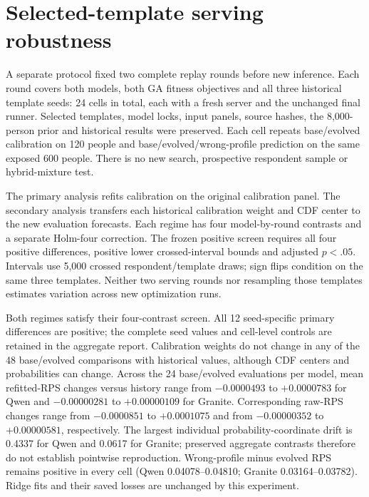 \documentclass[sigconf,anonymous]{aamas}
\begin{document}
\section{Selected-template serving robustness}
A separate protocol fixed two complete replay rounds before new inference.
Each round covers both models, both GA fitness objectives and all three
historical template seeds: 24 cells in total, each with a fresh server and
the unchanged final runner. Selected templates, model locks, input panels,
source hashes, the 8,000-person prior and historical results were preserved.
Each cell repeats base/evolved calibration on 120 people and
base/evolved/wrong-profile prediction on the same exposed 600 people.
There is no new search, prospective respondent sample or hybrid-mixture test.

The primary analysis refits calibration on the original calibration panel.
The secondary analysis transfers each historical calibration weight and CDF
center to the new evaluation forecasts. Each regime has four model-by-round
contrasts and a separate Holm-four correction. The frozen positive screen
requires all four positive differences, positive lower crossed-interval bounds
and adjusted $p<.05$. Intervals use 5,000 crossed respondent/template draws;
sign flips condition on the same three templates. Neither two serving rounds
nor resampling those templates estimates variation across new optimization runs.



Both regimes satisfy their four-contrast screen. All 12 seed-specific primary
differences are positive; the complete seed values and cell-level controls
are retained in the aggregate report. Calibration weights do not change in
any of the 48 base/evolved comparisons with historical values, although CDF
centers and probabilities can change. Across the 24 base/evolved evaluations
per model, mean refitted-RPS changes versus history range from
$-0.0000493$ to $+0.0000783$ for Qwen and $-0.00000281$ to $+0.00000109$
for Granite. Corresponding raw-RPS changes range from $-0.0000851$ to
$+0.0001075$ and from $-0.00000352$ to $+0.00000581$, respectively.
The largest individual probability-coordinate drift is 0.4337 for Qwen and
0.0617 for Granite; preserved aggregate contrasts therefore do not establish
pointwise reproduction. Wrong-profile minus evolved RPS remains positive in
every cell (Qwen 0.04078--0.04810; Granite 0.03164--0.03782).
Ridge fits and their saved losses are unchanged by this experiment.
\end{document}
